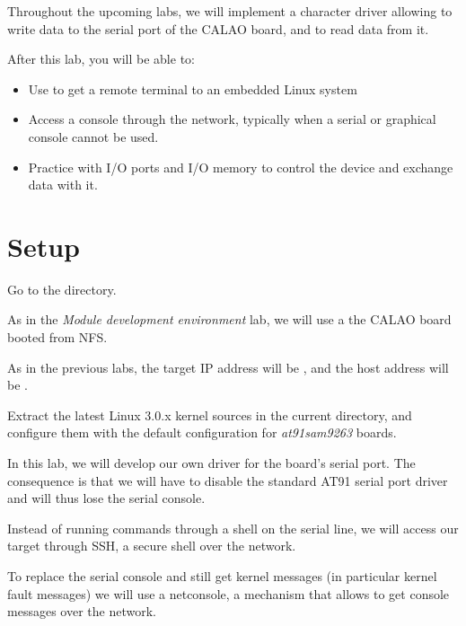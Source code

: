 
Throughout the upcoming labs, we will implement a character driver
allowing to write data to the serial port of the CALAO board, and to
read data from it.

After this lab, you will be able to:

\begin{itemize}

\item Use  to get a remote terminal to an embedded Linux
  system

\item Access a console through the network, typically when a serial or
  graphical console cannot be used.

\item Practice with I/O ports and I/O memory to control the device and
  exchange data with it.

\end{itemize}

\section{Setup}

Go to the  directory.

As in the {\em Module development environment} lab, we will use a the
CALAO board booted from NFS.

As in the previous labs, the target IP address will be ,
and the host address will be .

Extract the latest Linux 3.0.x kernel sources in the current
directory, and configure them with the default configuration for
{\em at91sam9263} boards.

In this lab, we will develop our own driver for the board's serial
port. The consequence is that we will have to disable the standard
AT91 serial port driver and will thus lose the serial console.

Instead of running commands through a shell on the serial line, we
will access our target through SSH, a secure shell over the network.

To replace the serial console and still get kernel messages (in
particular kernel fault messages) we will use a netconsole, a
mechanism that allows to get console messages over the network.

